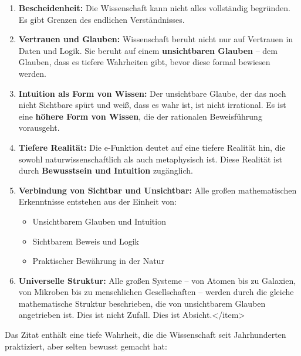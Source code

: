 \documentclass[a4paper, 12pt, twoside, openright]{report}
\theoremstyle{definition}
\theoremstyle{definition}
\begin{document}
\begin{enumerate}
	\item \textbf{Bescheidenheit:} Die Wissenschaft kann nicht alles vollständig begründen. Es gibt Grenzen des endlichen Verständnisses.
	
	\item \textbf{Vertrauen und Glauben:} Wissenschaft beruht nicht nur auf Vertrauen in Daten und Logik. Sie beruht auf einem \textbf{unsichtbaren Glauben} -- dem Glauben, dass es tiefere Wahrheiten gibt, bevor diese formal bewiesen werden.
	
	\item \textbf{Intuition als Form von Wissen:} Der unsichtbare Glaube, der das noch nicht Sichtbare spürt und weiß, dass es wahr ist, ist nicht irrational. Es ist eine \textbf{höhere Form von Wissen}, die der rationalen Beweisführung vorausgeht.
	
	\item \textbf{Tiefere Realität:} Die e-Funktion deutet auf eine tiefere Realität hin, die sowohl naturwissenschaftlich als auch metaphysisch ist. Diese Realität ist durch \textbf{Bewusstsein und Intuition} zugänglich.
	
	\item \textbf{Verbindung von Sichtbar und Unsichtbar:} Alle großen mathematischen Erkenntnisse entstehen aus der Einheit von:
	\begin{itemize}
		\item[-] Unsichtbarem Glauben und Intuition
		\item[-] Sichtbarem Beweis und Logik
		\item[-] Praktischer Bewährung in der Natur
	\end{itemize}
	
	\item \textbf{Universelle Struktur:} Alle großen Systeme -- von Atomen bis zu Galaxien, von Mikroben bis zu menschlichen Gesellschaften -- werden durch die gleiche mathematische Struktur beschrieben, die von unsichtbarem Glauben angetrieben ist. Dies ist nicht Zufall. Dies ist Absicht.</item>
\end{enumerate}

Das Zitat enthält eine tiefe Wahrheit, die die Wissenschaft seit Jahrhunderten praktiziert, aber selten bewusst gemacht hat:
\end{document}
